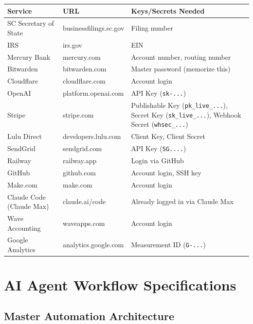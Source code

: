 \documentclass[12pt, letterpaper, oneside]{book}
\begin{document}
\begin{longtable}{p{1.5in}p{1.8in}p{2.2in}}
\toprule
\textbf{Service} & \textbf{URL} & \textbf{Keys/Secrets Needed} \\
\midrule
\endhead
SC Secretary of State & businessfilings.sc.gov & Filing number \\
IRS & irs.gov & EIN \\
Mercury Bank & mercury.com & Account number, routing number \\
Bitwarden & bitwarden.com & Master password (memorize this) \\
Cloudflare & cloudflare.com & Account login \\
OpenAI & platform.openai.com & API Key (\texttt{sk-...}) \\
Stripe & stripe.com & Publishable Key (\texttt{pk\_live\_...}), Secret Key (\texttt{sk\_live\_...}), Webhook Secret (\texttt{whsec\_...}) \\
Lulu Direct & developers.lulu.com & Client Key, Client Secret \\
SendGrid & sendgrid.com & API Key (\texttt{SG....}) \\
Railway & railway.app & Login via GitHub \\
GitHub & github.com & Account login, SSH key \\
Make.com & make.com & Account login \\
Claude Code (Claude Max) & claude.ai/code & Already logged in via Claude Max \\
Wave Accounting & waveapps.com & Account login \\
Google Analytics & analytics.google.com & Measurement ID (\texttt{G-...}) \\
\bottomrule
\end{longtable}


\chapter{AI Agent Workflow Specifications}

\section{Master Automation Architecture}
\end{document}
